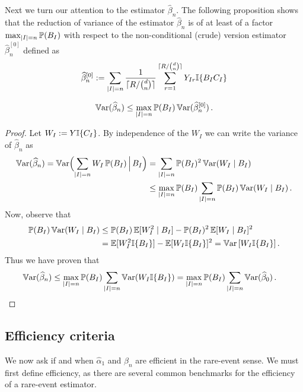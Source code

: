 Next we turn our attention to the estimator $\hat{\beta}_n$.
The following proposition shows that the reduction of variance of the estimator
$\hat{\beta}_n$ is of at least of a factor $\max_{\lvert I\rvert=n}\operatorname{{\mathbb P}}(B_I)$
with respect to the non-conditional (crude) version estimator $\hat{\beta}_n^{[0]}$
defined as
\begin{equation}
 \hat{\beta}_n^{[0]}\defeq\sum_{\card{I}=n} \frac1{\lceil R / \binom{d}{n} \rceil} \sum_{r=1}^{\lceil R / \binom{d}{n} \rceil}  Y_{Ir}\ind{B_IC_I}%
\end{equation}
\begin{proposition}\label{prop:VarRedCMC}
 \begin{equation*}
  \operatorname{\mathbb{V}\mathrm{ar}}(\widehat{\beta}_n) \le \max_{\lvert I\rvert=n}\operatorname{{\mathbb P}}(B_I)
   \operatorname{\mathbb{V}\mathrm{ar}}(\widehat{\beta}_n^{[0]}) \,.
 \end{equation*}
\end{proposition}
\begin{proof}
Let $W_I := Y\mathbb{I}\{ C_I \}$.  By independence of the $W_I$
we can write the variance of $\hat{\beta}_n$ as
\begin{align*}
\operatorname{\mathbb{V}\mathrm{ar}}(\widehat{\beta}_n)
  =\operatorname{\mathbb{V}\mathrm{ar}}\Bigl(\sum_{\lvert I\rvert=n} W_I \operatorname{{\mathbb P}}(B_I) \,\Big|\, B_I \Bigr)
     &=\sum_{\lvert I\rvert=n} \operatorname{{\mathbb P}}(B_I)^2 \operatorname{\mathbb{V}\mathrm{ar}}( W_I \mid B_I )\\
     &\le\max_{\lvert I\rvert=n}\operatorname{{\mathbb P}}(B_I)\sum_{\lvert I\rvert=n} \operatorname{{\mathbb P}}(B_I)\operatorname{\mathbb{V}\mathrm{ar}}( W_I \mid B_I )\,.
\end{align*}
Now, observe that
\begin{align*}
 \operatorname{{\mathbb P}}(B_I)\operatorname{\mathbb{V}\mathrm{ar}}( W_I \mid B_I )
   &\le\operatorname{{\mathbb P}}(B_I)\operatorname{{\mathbb E}}[ W_I^2 \mid B_I] -{\operatorname{{\mathbb P}}(B_I)^2\operatorname{{\mathbb E}}[W_I \mid B_I ]^2}\\
   &=\operatorname{{\mathbb E}}[W_I^2\mathbb{I}\{ B_I \}]-\operatorname{{\mathbb E}}[W_I\mathbb{I}\{ B_I \}]^2
   =\operatorname{\mathbb{V}\mathrm{ar}}\left[W_I\mathbb{I}\{ B_I \}\right].
\end{align*}
Thus we have proven that
\begin{align*}
\operatorname{\mathbb{V}\mathrm{ar}} ( \widehat{\beta}_n )
   &\le\max_{\lvert I\rvert=n}\operatorname{{\mathbb P}}(B_I)\sum_{\lvert I\rvert=n} \operatorname{\mathbb{V}\mathrm{ar}}( W_I\mathbb{I}\{ B_I \} )
   =\max_{\lvert I\rvert=n}\operatorname{{\mathbb P}}(B_I)\sum_{\lvert I\rvert=n}\operatorname{\mathbb{V}\mathrm{ar}}(\widehat{\beta}_0 )\,.
\end{align*}
\end{proof}


\subsection{Efficiency criteria} \label{scn:criteria}

We now ask if and when $\hat{\alpha}_1$ and $\hat{\beta}_n$ are efficient in the rare-event sense. We must first define efficiency, as there are several common benchmarks for the efficiency of a rare-event estimator.

